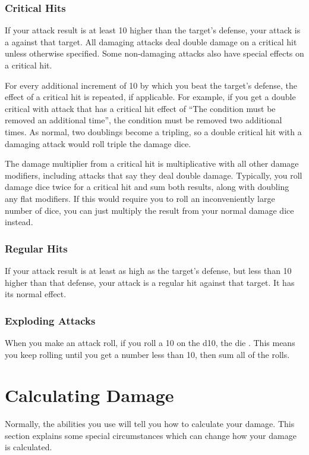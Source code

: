     \subsubsection{Critical Hits}\label{Critical Hits}
      If your attack result is at least 10 higher than the target's defense, your attack is a  against that target.
      All damaging attacks deal double damage on a critical hit unless otherwise specified.
      Some non-damaging attacks also have special effects on a critical hit.

      For every additional increment of 10 by which you beat the target's defense, the effect of a critical hit is repeated, if applicable.
      For example, if you get a double critical with attack that has a critical hit effect of ``The condition must be removed an additional time'', the condition must be removed two additional times.
      As normal, two doublings become a tripling, so a double critical hit with a damaging attack would roll triple the damage dice.

      The damage multiplier from a critical hit is multiplicative with all other damage modifiers, including attacks that say they deal double damage.
      Typically, you roll damage dice twice for a critical hit and sum both results, along with doubling any flat modifiers.
      If this would require you to roll an inconveniently large number of dice, you can just multiply the result from your normal damage dice instead.

    \subsubsection{Regular Hits}
      If your attack result is at least as high as the target's defense, but less than 10 higher than that defense, your attack is a regular hit against that target.
      It has its normal effect.

    \subsubsection{Exploding Attacks}\label{Exploding Attacks}
      When you make an attack roll, if you roll a 10 on the d10, the die .
      This means you keep rolling until you get a number less than 10, then sum all of the rolls.

\section{Calculating Damage}
  Normally, the abilities you use will tell you how to calculate your damage.
  This section explains some special circumstances which can change how your damage is calculated.

